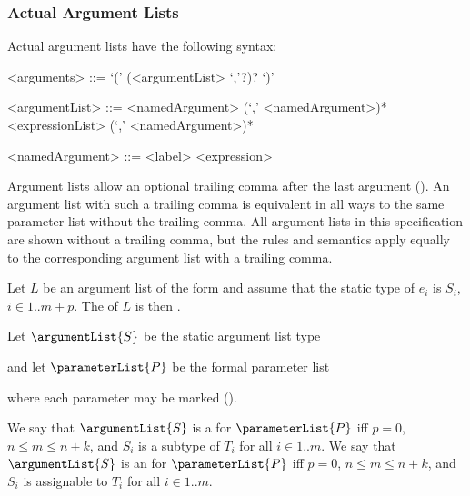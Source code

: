 \documentclass[makeidx]{article}
\begin{document}
{


\subsubsection{Actual Argument Lists}

\LMHash{}%
Actual argument lists have the following syntax:

\begin{grammar}
<arguments> ::= `(' (<argumentList> `,'?)? `)'

<argumentList> ::= <namedArgument> (`,' <namedArgument>)*
  \alt <expressionList> (`,' <namedArgument>)*

<namedArgument> ::= <label> <expression>
\end{grammar}

\LMHash{}%
Argument lists allow an optional trailing comma after the last argument
().
An argument list with such a trailing comma is equivalent in all ways to
the same parameter list without the trailing comma.
All argument lists in this specification are shown without a trailing comma,
but the rules and semantics apply equally to
the corresponding argument list with a trailing comma.

\LMHash{}%
Let $L$ be an argument list of the form
and assume that the static type of $e_i$ is $S_i$, $i \in 1 .. m+p$.
The  of $L$ is then
.

\LMHash{}%
Let $\argumentList{S}$ be the static argument list type

\noindent
{}

\noindent
and let $\parameterList{P}$ be the formal parameter list

\noindent
{}

\noindent
where each parameter may be marked \COVARIANT{}
().

\LMHash{}%
We say that $\argumentList{S}$ is
a  for $\parameterList{P}$
if{}f $p = 0$, $n \leq m \leq n+k$, and $S_i$ is
a subtype of $T_i$ for all $i \in 1 .. m$.
We say that $\argumentList{S}$ is
an  for $\parameterList{P}$
if{}f $p = 0$, $n \leq m \leq n+k$, and $S_i$ is
assignable to $T_i$ for all $i \in 1 .. m$.

}
\end{document}
